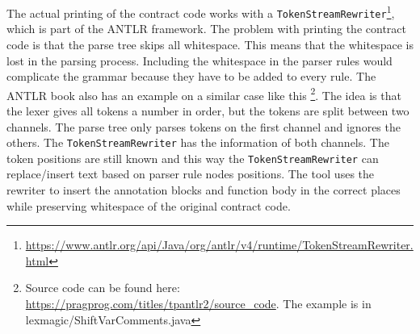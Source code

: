 \documentclass[a4paper]{article}
\begin{document}
The actual printing of the contract code works with a \texttt{TokenStreamRewriter}\footnote{\url{https://www.antlr.org/api/Java/org/antlr/v4/runtime/TokenStreamRewriter.html}}, which is part of the ANTLR framework. The problem with printing the contract code is that the parse tree skips all whitespace. This means that the whitespace is lost in the parsing process. Including the whitespace in the parser rules would complicate the grammar because they have to be added to every rule. The ANTLR book also has an example on a similar case like this \footnote{Source code can be found here: \url{https://pragprog.com/titles/tpantlr2/source_code}. The example is in lexmagic/ShiftVarComments.java}. The idea is that the lexer gives all tokens a number in order, but the tokens are split between two channels. The parse tree only parses tokens on the first channel and ignores the others. The \texttt{TokenStreamRewriter} has the information of both channels. The token positions are still known and this way the \texttt{TokenStreamRewriter} can replace/insert text based on parser rule nodes positions. The tool uses the rewriter to insert the annotation blocks and function body in the correct places while preserving whitespace of the original contract code.
\end{document}
